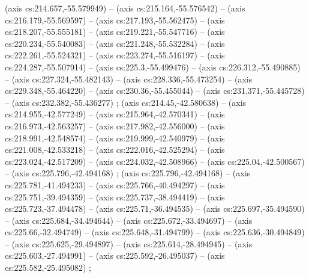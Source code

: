     (axis cs:214.657,-55.579949) --  (axis cs:215.164,-55.576542) --  (axis cs:216.179,-55.569597) --  (axis cs:217.193,-55.562475) --  (axis cs:218.207,-55.555181) --  (axis cs:219.221,-55.547716) --  (axis cs:220.234,-55.540083) --  (axis cs:221.248,-55.532284) --  (axis cs:222.261,-55.524321) --  (axis cs:223.274,-55.516197) --  (axis cs:224.287,-55.507914) --  (axis cs:225.3,-55.499476) --  (axis cs:226.312,-55.490885) --  (axis cs:227.324,-55.482143) --  (axis cs:228.336,-55.473254) --  (axis cs:229.348,-55.464220) --  (axis cs:230.36,-55.455044) --  (axis cs:231.371,-55.445728) --  (axis cs:232.382,-55.436277) ;
    (axis cs:214.45,-42.580638) --  (axis cs:214.955,-42.577249) --  (axis cs:215.964,-42.570341) --  (axis cs:216.973,-42.563257) --  (axis cs:217.982,-42.556000) --  (axis cs:218.991,-42.548574) --  (axis cs:219.999,-42.540979) --  (axis cs:221.008,-42.533218) --  (axis cs:222.016,-42.525294) --  (axis cs:223.024,-42.517209) --  (axis cs:224.032,-42.508966) --  (axis cs:225.04,-42.500567) --  (axis cs:225.796,-42.494168) ;
    (axis cs:225.796,-42.494168) --  (axis cs:225.781,-41.494233) --  (axis cs:225.766,-40.494297) --  (axis cs:225.751,-39.494359) --  (axis cs:225.737,-38.494419) --  (axis cs:225.723,-37.494478) --  (axis cs:225.71,-36.494535) --  (axis cs:225.697,-35.494590) --  (axis cs:225.684,-34.494644) --  (axis cs:225.672,-33.494697) --  (axis cs:225.66,-32.494749) --  (axis cs:225.648,-31.494799) --  (axis cs:225.636,-30.494849) --  (axis cs:225.625,-29.494897) --  (axis cs:225.614,-28.494945) --  (axis cs:225.603,-27.494991) --  (axis cs:225.592,-26.495037) --  (axis cs:225.582,-25.495082) ;
